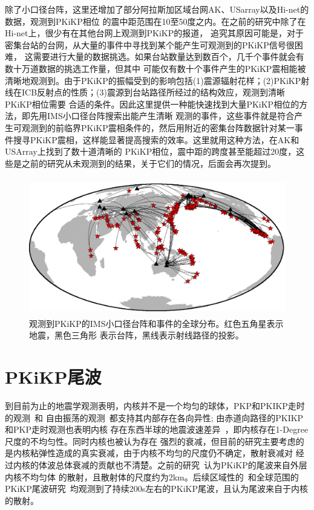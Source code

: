 除了小口径台阵，这里还增加了部分阿拉斯加区域台网AK、USarray以及Hi-net的数据，观测到PKiKP相位
的震中距范围在10至50度之内。在之前的研究中除了在Hi-net上，很少有在其他台网上观测到PKiKP的报道，
追究其原因可能是，对于密集台站的台网，从大量的事件中寻找到某个能产生可观测到的PKiKP信号很困难，
这需要进行大量的数据挑选。如果台站数量达到数百个，几千个事件就会有数十万道数据的挑选工作量，但其中
可能仅有数十个事件产生的PKiKP震相能被清晰地观测到。由于PKiKP的振幅受到的影响包括(1)震源辐射花样；(2)PKiKP射线在ICB反射点的性质；(3)震源到台站路径所经过的结构效应，观测到清晰PKiKP相位需要
合适的条件。因此这里提供一种能快速找到大量PKiKP相位的方法，即先用IMS小口径台阵搜索出能产生清晰
观测的事件，这些事件就是符合产生可观测到的前临界PKiKP震相条件的，然后用附近的密集台阵数据针对某一事件搜寻PKiKP震相，这样能显著提高搜索的效率。这里就用这种方法，在AK和USArray上找到了数十道清晰的
PKiKP相位，震中距的跨度甚至能超过20度，这些是之前的研究从未观测到的结果，关于它们的情况，后面会再次提到。

\begin{figure}
	\centering
	\includegraphics[width=12cm,height=6cm]{fig/chap3/global.eps}
	\caption{观测到PKiKP的IMS小口径台阵和事件的全球分布。红色五角星表示地震，黑色三角形%
表示台阵，黑线表示射线路径的投影。}
\end{figure}

\newpage

\section{PKiKP尾波}


到目前为止的地震学观测表明，内核并不是一个均匀的球体，PKP和PKIKP走时的观测~\citep{Creager1992}和
自由振荡的观测~\citep{Tromp1993}都支持其内部存在各向异性; 由赤道向路径的PKIKP和PKP走时观测也表明内核
存在东西半球的地震波速差异~\citep{Tanaka1997}，即内核存在1-Degree尺度的不均匀性。同时内核也被认为存在
强烈的衰减，但目前的研究主要考虑的是内核粘弹性造成的真实衰减，由于内核不均匀的尺度仍不确定，散射衰减对
经过内核的体波总体衰减的贡献也不清楚。之前的研究~\citep{Vidale2000}认为PKiKP的尾波来自外层内核不均匀体
的散射，且散射体的尺度约为2km。后续区域性的~\citep{Poupinet2004}和全球范围的PKiKP尾波研究~\citep{Koper2004}均观测到了持续200s左右的PKiKP尾波，且认为尾波来自于内核的散射。

